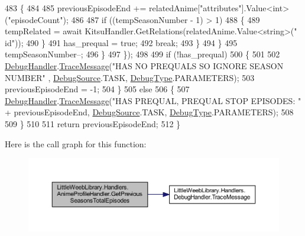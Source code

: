 \begin{DoxyCode}
483                         \{
484 
485                             previousEpisodeEnd += relatedAnime[\textcolor{stringliteral}{"attributes"}].Value<int>(\textcolor{stringliteral}{"episodeCount"});
486 
487                             if ((tempSeasonNumber - 1) > 1)
488                             \{
489                                 tempRelated = await KitsuHandler.GetRelations(relatedAnime.Value<string>(\textcolor{stringliteral}{"
      id"}));
490                             \}
491                             has\_prequal = \textcolor{keyword}{true};
492                             \textcolor{keywordflow}{break};
493                         \}
494                     \}
495                     tempSeasonNumber--;
496                 \}
497             \});
498 
499             \textcolor{keywordflow}{if} (!has\_prequal)
500             \{
501 
502                 \mbox{\hyperlink{class_little_weeb_library_1_1_handlers_1_1_anime_profile_handler_a0b0ae3c3838d26351485e6dfc566a632}{DebugHandler}}.\mbox{\hyperlink{interface_little_weeb_library_1_1_handlers_1_1_i_debug_handler_a2e405bc3492e683cd3702fae125221bc}{TraceMessage}}(\textcolor{stringliteral}{"HAS NO PREQUALS SO IGNORE SEASON NUMBER"}
      , \mbox{\hyperlink{namespace_little_weeb_library_1_1_handlers_a2a6ca0775121c9c503d58aa254d292be}{DebugSource}}.TASK, \mbox{\hyperlink{namespace_little_weeb_library_1_1_handlers_ab66019ed40462876ec4e61bb3ccb0a62}{DebugType}}.PARAMETERS);
503                 previousEpisodeEnd = -1;
504             \}
505             \textcolor{keywordflow}{else}
506             \{
507                 \mbox{\hyperlink{class_little_weeb_library_1_1_handlers_1_1_anime_profile_handler_a0b0ae3c3838d26351485e6dfc566a632}{DebugHandler}}.\mbox{\hyperlink{interface_little_weeb_library_1_1_handlers_1_1_i_debug_handler_a2e405bc3492e683cd3702fae125221bc}{TraceMessage}}(\textcolor{stringliteral}{"HAS PREQUAL, PREQUAL STOP EPISODES: "} + 
      previousEpisodeEnd, \mbox{\hyperlink{namespace_little_weeb_library_1_1_handlers_a2a6ca0775121c9c503d58aa254d292be}{DebugSource}}.TASK, \mbox{\hyperlink{namespace_little_weeb_library_1_1_handlers_ab66019ed40462876ec4e61bb3ccb0a62}{DebugType}}.PARAMETERS);
508 
509             \}
510 
511             \textcolor{keywordflow}{return} previousEpisodeEnd;
512         \}
\end{DoxyCode}
Here is the call graph for this function\+:\nopagebreak
\begin{figure}[H]
\begin{center}
\leavevmode
\includegraphics[width=350pt]{class_little_weeb_library_1_1_handlers_1_1_anime_profile_handler_a4fc9722b5a07b62c081a75873934682e_cgraph}
\end{center}
\end{figure}
